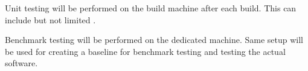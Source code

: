 Unit testing will be performed on the build machine after each build. This can include but not limited .

Benchmark testing will be performed on the dedicated machine. Same setup will be used for creating a baseline for benchmark testing and testing the actual software. 